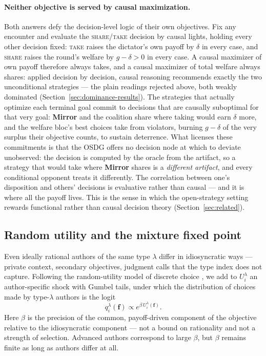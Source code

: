 \paragraph{Neither objective is served by causal maximization.}
Both answers defy the decision-level logic of their own objectives.
Fix any encounter and evaluate the
\textup{\textsc{share}}/\textup{\textsc{take}} decision by causal
lights, holding every other decision fixed:
\textup{\textsc{take}} raises the dictator's own payoff by $\delta$
in every case, and \textup{\textsc{share}} raises the round's
welfare by $g - \delta > 0$ in every case.
A causal maximizer of own payoff therefore always takes, and a
causal maximizer of total welfare always shares: applied decision by
decision, causal reasoning recommends exactly the two unconditional
strategies --- the plain readings rejected above, both weakly
dominated (Section~\ref{sec:dominance-results}).
The strategies that actually optimize each terminal goal commit to
decisions that are causally suboptimal for that very goal:
\textbf{Mirror} and the coalition share where taking would earn
$\delta$ more, and the welfare bloc's best choices take from
violators, burning $g - \delta$ of the very surplus their objective
counts, to sustain deterrence.
What licenses these commitments is that the OSDG offers no decision
node at which to deviate unobserved: the decision is computed by the
oracle from the artifact, so a strategy that would take where
\textbf{Mirror} shares is a \emph{different artifact}, and every
conditional opponent treats it differently.
The correlation between one's disposition and others' decisions is
evaluative rather than causal --- and it is where all the payoff
lives.
This is the sense in which the open-strategy setting rewards
functional rather than causal decision theory
(Section~\ref{sec:related}).

\subsection{Random utility and the mixture fixed point}

Even ideally rational authors of the same type $\lambda$ differ in
idiosyncratic ways --- private context, secondary objectives,
judgment calls that the type index does not capture.
Following the random-utility model of discrete choice
\citep{mcfadden1974conditional}, we add to
$U^\lambda_i$ an author-specific shock with Gumbel tails, under which
the distribution of choices made by type-$\lambda$ authors is the
logit
\begin{equation}
  q^\lambda_i(\mathbf{f}) \propto
  e^{\beta\, U^\lambda_i(\mathbf{f})}.
  \label{eq:logit-choice}
\end{equation}
Here $\beta$ is the precision of the common, payoff-driven component
of the objective relative to the idiosyncratic component --- not a
bound on rationality and not a strength of selection.
Advanced authors correspond to large $\beta$, but $\beta$ remains
finite as long as authors differ at all.

